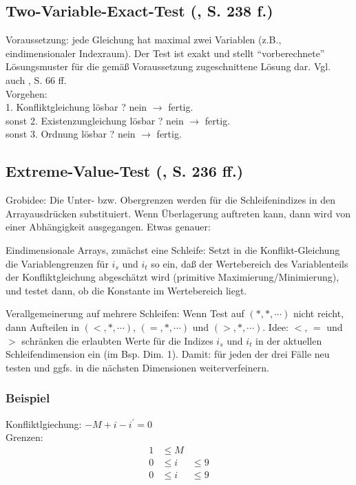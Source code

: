 \subsection{Two-Variable-Exact-Test (\cite{Wol95}, S. 238  f.)}

Voraussetzung: jede Gleichung hat maximal zwei Variablen (z.B.,
eindimensionaler Indexraum). Der Test ist exakt und stellt
``vorberechnete'' Lösungsmuster für die gemäß Voraussetzung
zugeschnittene Lösung dar. Vgl. auch \cite{Ban93}, S. 66 ff.\\
Vorgehen:\\
1. Konfliktgleichung lösbar ? nein \( \rightarrow  \) fertig. \\
sonst 2. Existenzungleichung lösbar ? nein \( \rightarrow \) fertig. \\
sonst 3. Ordnung lösbar ? nein \( \rightarrow \) fertig.


\subsection{Extreme-Value-Test (\cite{Wol95}, S. 236   ff.)} 

Grobidee: Die Unter- bzw. Obergrenzen werden für die Schleifenindizes in
den Arrayausdrücken substituiert. Wenn Überlagerung auftreten kann, dann
wird von einer Abhängigkeit ausgegangen. Etwas genauer:

Eindimensionale Arrays, zunächst eine Schleife: Setzt in die
Konflikt-Gleichung die Variablengrenzen für $i_s$ und $i_t$ so ein, daß
der Wertebereich des Variablenteils der Konfliktgleichung abgeschätzt
wird (primitive Maximierung/Minimierung), und testet dann, ob die
Konstante im Wertebereich liegt.

Verallgemeinerung auf mehrere Schleifen: Wenn Test auf $(*,*,\cdots)$
nicht reicht, dann Aufteilen in $(<,*,\cdots)$, $(=,*,\cdots)$ und
$(>,*,\cdots)$. Idee: $<$, $=$ und $>$ schränken die erlaubten Werte für 
die Indizes $i_s$ und $i_t$ in der aktuellen Schleifendimension ein (im
Bsp. Dim. 1). Damit: für jeden der drei Fälle neu testen und ggfs. in
die nächsten Dimensionen weiterverfeinern.

\subsubsection{Beispiel}
Konfliktlgiechung: \( -M + i - i^\prime = 0 \) \\
Grenzen: 
\begin{align*} 
   1 & \leq M \\ 
   0 & \leq i & \leq 9 \\
   0 & \leq i & \leq 9
\end{align*}


